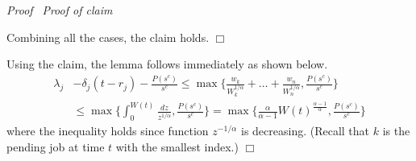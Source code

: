 \documentclass[11pt]{article}
\newenvironment{proof}{\noindent\emph{Proof\ }}{\hspace*{\fill}$\Box$\medskip}
\newenvironment{claimproof}{\noindent\emph{Proof of claim\ }}{\hspace*{\fill}$\Box$\medskip}
\begin{document}
\begin{proof}
\begin{claimproof}
\begin{description}
\end{description}
Combining all the cases, the claim holds.
\end{claimproof}

Using the claim, the lemma follows immediately as shown below.
\begin{align*}
\lambda_{j} &- \delta_{j} (t-r_{j}) - \frac{P(s^{c})}{s^{c}}
\leq \max \biggl \{ \frac{w_{k}}{W_{k}^{1/\alpha}} + \ldots + \frac{w_{n}}{W_{n}^{1/\alpha}}, \frac{P(s^{c})}{s^{c}} \biggl \} \\
&\leq \max \biggl \{ \int_{0}^{W(t)} \frac{dz}{z^{1/\alpha}}, \frac{P(s^{c})}{s^{c}} \biggl \}   
= \max \biggl \{ \frac{\alpha}{\alpha - 1} W(t)^{\frac{\alpha-1}{\alpha}}, \frac{P(s^{c})}{s^{c}} \biggl \}  	
\end{align*}
where the inequality holds since function $z^{-1/\alpha}$ is decreasing. (Recall that $k$ is the pending job 
at time $t$ with the smallest index.)
\end{proof}
\end{document}
